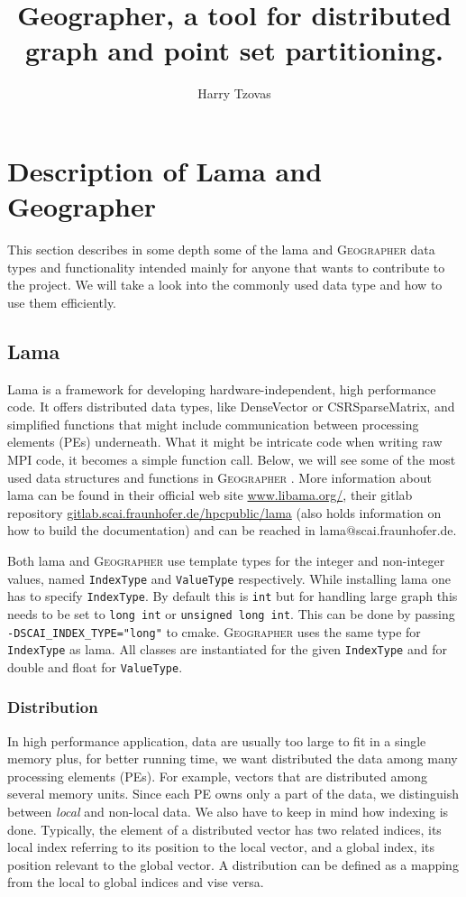 \documentclass[a4paper,10pt]{article}
\author{Harry Tzovas}
\title{Geographer, a tool for distributed graph and point set partitioning.}
\newcommand{\geo}{\textsc{Geographer} }
\newcommand{\MI}[1]{\texttt{#1}}
\begin{document}
\maketitle


\section*{Description of Lama and Geographer}

This section describes in some depth some of the lama and \geo data types and functionality intended
mainly for anyone that wants to contribute to the project. We will take a look into the commonly
used data type and how to use them efficiently.

\subsection*{Lama}

Lama is a framework for developing hardware-independent, high performance code. 
It offers distributed 
data types, like DenseVector or CSRSparseMatrix, and simplified functions that might 
include communication between processing elements (PEs) underneath.
What it might be intricate code when writing raw MPI code,
it becomes a simple function call. Below, we will see some of the most used data structures and 
functions in \geo.
More information about lama can be found in their official web site \url{www.libama.org/},
their gitlab repository \url{gitlab.scai.fraunhofer.de/hpcpublic/lama} (also holds information on how
to build the documentation) and can be reached in lama$@$scai.fraunhofer.de.

Both lama and \geo use template types for the integer and non-integer values, named
\MI{IndexType} and \MI{ValueType} respectively.
While installing lama one has to specify \MI{IndexType}. By default this is \MI{int}
but for handling large graph this needs to be set to \MI{long int} or \MI{unsigned long int}.
This can be done by passing \texttt{-DSCAI\_INDEX\_TYPE="long"} to cmake.
\geo uses the same type for \MI{IndexType} as lama. All classes are instantiated for the given 
\MI{IndexType} and for double and float for \MI{ValueType}.


\subsubsection*{Distribution}

In high performance application, data are usually too large to fit in a single memory plus, for
better running time, we want distributed the data among many processing elements (PEs).
For example, vectors that are distributed among several memory units.
Since each PE owns only a part of the data, we distinguish between \emph{local} 
and non-local data. We also have to keep in mind how indexing is done. Typically, the element
of a distributed vector has two related indices, its local index referring to its position
to the local vector, and a global index, its position relevant to the global vector.
A distribution can be defined as a mapping from the local to global indices and vise versa.
\end{document}
